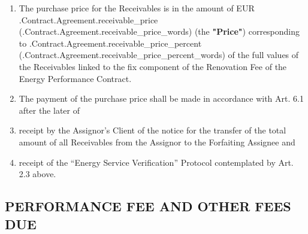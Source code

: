\documentclass[a4paper]{article}
\begin{document}
\begin{enumerate}
\item{The purchase price for the Receivables is in the amount of EUR
    \iffalse input forfaitingFields.receivable_price value="{{.Contract.Agreement.receivable_price}}" type="number" \fi {{.Contract.Agreement.receivable_price}} (\iffalse input forfaitingFields.receivable_price_words value="{{.Contract.Agreement.receivable_price_words}}" \fi {{.Contract.Agreement.receivable_price_words}}) (the \textbf{"Price"}) corresponding to
    \iffalse input forfaitingFields.receivable_price value="{{.Contract.Agreement.receivable_price_percent}}" type="number" \fi {{.Contract.Agreement.receivable_price_percent}} (\iffalse input forfaitingFields.receivable_price_percent_words value="{{.Contract.Agreement.receivable_price_percent_words}}" \fi {{.Contract.Agreement.receivable_price_percent_words}}) of the full values of the Receivables
    linked to the fix component of the Renovation Fee of the Energy
    Performance Contract.}

\item{The payment of the purchase price shall be made in accordance
    with Art. 6.1 after the later of}

\item{receipt by the Assignor’s Client of the notice for the transfer
    of the total amount of all Receivables from the Assignor to the
    Forfaiting Assignee and }

\item{receipt of the “Energy Service Verification” Protocol contemplated by
    Art. 2.3 above.}
\end{enumerate}

\subsection{PERFORMANCE FEE AND OTHER FEES DUE}
\end{document}

